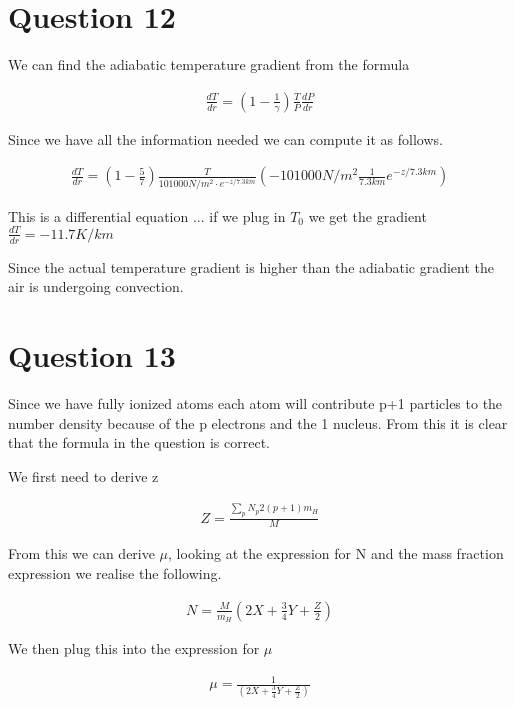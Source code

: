 \documentclass[a4paper]{article}
\begin{document}
\section*{Question 12}

We can find the adiabatic temperature gradient from the formula

\begin{align}
    \frac{dT}{dr} = \left ( 1 - \frac{1}{\gamma} \right ) \frac{T}{P} \frac{dP}{dr}
\end{align}

Since we have all the information needed we can compute it as follows.

\begin{align}
    \frac{dT}{dr} = \left ( 1 - \frac{5}{7} \right ) \frac{T}{101 000N/m^2 \cdot e^{-z/7.3km}} (- 101 000 N/m^2 \frac{1}{7.3km} e^{-z/7.3km})
\end{align}

This is a differential equation ... if we plug in $T_0$ we get the gradient $\frac{dT}{dr} = -11.7 K/km$

Since the actual temperature gradient is higher than the adiabatic gradient the air is undergoing convection. 

\section*{Question 13}

Since we have fully ionized atoms each atom will contribute p+1 particles to the number density because of the p electrons and the 1 nucleus. From this it is clear that the formula in the question is correct.

We first need to derive z

\begin{align}
    Z = \frac{\sum_p N_p 2 (p+1)m_H}{M}
\end{align}

From this we can derive $\mu$, looking at the expression for N and the mass fraction expression we realise the following.

\begin{align}
    N = \frac{M}{m_H} \left ( 2X + \frac{3}{4} Y + \frac{Z}{2}\right )
\end{align}

We then plug this into the expression for $\mu$

\begin{align}
    \mu = \frac{1}{\left ( 2X + \frac{3}{4} Y + \frac{Z}{2}\right )}
\end{align}
\end{document}
